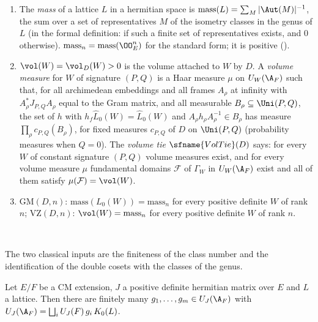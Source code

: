 \begin{definition}\label{pf:sh-siegel:massdef}
\begin{enumerate}[label=(\alph*)]
\item The \emph{mass} of a lattice $L$ in a hermitian space is $\mathrm{mass}(L)=\sum_M|\Aut(M)|^{-1}$, the sum over a set of
representatives $M$ of the isometry classes in the genus of $L$ (in the formal definition: if such a finite set of
representatives exists, and $0$ otherwise). $\mathrm{mass}_n=\mathrm{mass}(\OO_E^n)$ for the standard form; it is positive
().
\item $\vol(W)=\vol_D(W)>0$ is the volume attached to $W$ by $D$. A \emph{volume measure} for $W$ of signature $(P,Q)$ is a Haar
measure $\mu$ on $U_W(\A_F)$ such that, for all archimedean embeddings and all frames $A_\rho$ at infinity with
$A_\rho^*J_{P,Q}A_\rho$ equal to the Gram matrix, and all measurable $B_\rho\subseteq\Uni(P,Q)$, the set of $h$ with
$h_f\widehat L_0(W)=\widehat L_0(W)$ and $A_\rho h_\rho A_\rho^{-1}\in B_\rho$ has measure $\prod_\rho c_{P,Q}(B_\rho)$, for fixed
measures $c_{P,Q}$ of $D$ on $\Uni(P,Q)$ (probability measures when $Q=0$). The \emph{volume tie} $\sfname{VolTie}(D)$ says:
for every $W$ of constant signature $(P,Q)$ volume measures exist, and for every volume measure $\mu$ fundamental domains $\mathcal
F$ of $\Gamma_W$ in $U_W(\A_F)$ exist and all of them satisfy $\mu(\mathcal F)=\vol(W)$.
\item $\mathrm{GM}(D,n)$: $\mathrm{mass}(L_0(W))=\mathrm{mass}_n$ for every positive definite $W$ of rank $n$;
$\mathrm{VZ}(D,n)$: $\vol(W)=\mathrm{mass}_n$ for every positive definite $W$ of rank $n$.
\end{enumerate}
\ \
\
\end{definition}

The two classical inputs are the finiteness of the class number and the identification of the double cosets with the
classes of the genus.

\begin{littheorem}\label{pf:sh-siegel:classfin}
Let $E/F$ be a CM extension, $J$ a positive definite hermitian matrix over $E$ and $L$ a lattice. Then there are finitely many
$g_1,\dots,g_m\in U_J(\A_F)$ with $U_J(\A_F)=\bigsqcup_i U_J(F)\,g_i\,K_0(L)$.
\end{littheorem}

